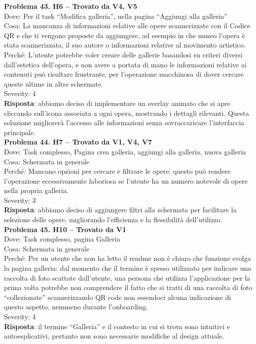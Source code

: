 \documentclass{article}
\begin{document}
\noindent \textbf{Problema 43. H6 – Trovato da V4, V5} \\
Dove: Per il task “Modifica galleria”, nella pagina “Aggiungi alla galleria” \\
Cosa: La mancanza di informazioni relative alle opere scannerizzate con il Codice QR e che ti vengono proposte da aggiungere, ad esempio in che museo l’opera è stata scannerizzata, il suo autore o informazioni relative al movimento artistico. \\
Perché: L’utente potrebbe voler creare delle gallerie basandosi su criteri diversi dall’estetica dell’opera, e non avere a portata di mano le informazioni relative ai contenuti può risultare frustrante, per l’operazione macchinosa di dover cercare queste ultime in altre schermate. \\
Severity: 4 \\
\textbf{Risposta}: abbiamo deciso di implementare un overlay animato che si apre cliccando sull’icona associata a ogni opera, mostrando i dettagli rilevanti. Questa soluzione migliorerà l’accesso alle informazioni senza sovraccaricare l’interfaccia principale.\\

\noindent \textbf{Problema 44. H7 – Trovato da V1, V4, V7} \\
Dove: Task complesso, Pagina crea galleria, aggiungi alla galleria, nuova galleria \\
Cosa: Schermata in generale \\
Perché: Mancano opzioni per cercare e filtrare le opere: questo può rendere l’operazione eccessivamente laboriosa se l’utente ha un numero notevole di opere nella propria galleria. \\
Severity: 3 \\
\textbf{Risposta}: abbiamo deciso di aggiungere filtri alla schermata per facilitare la selezione delle opere, migliorando l’efficienza e la flessibilità dell’utilizzo.\\

\noindent \textbf{Problema 45. H10 – Trovato da V1} \\
Dove: Task complesso, pagina Galleria \\
Cosa: Schermata in generale \\
Perché: Per un utente che non ha letto il readme non è chiaro che funzione svolga la pagina galleria: dal momento che il termine è spesso utilizzato per indicare una raccolta di foto scattate dall’utente, una persona che utilizza l’applicazione per la prima volta potrebbe non comprendere il fatto che si tratti di una raccolta di foto “collezionate” scannerizzando QR code non essendoci alcuna indicazione di questo aspetto, nemmeno durante l’onboarding. \\
Severity: 4 \\
\textbf{Risposta}: il termine “Galleria” e il contesto in cui si trova sono intuitivi e autoesplicativi, pertanto non sono necessarie modifiche al design attuale.\\
\end{document}
